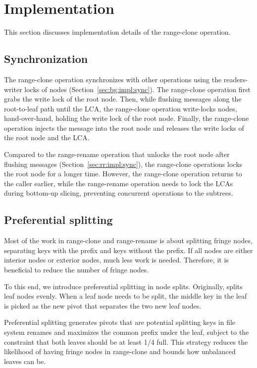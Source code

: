 \section{Implementation}
\label{sec:rc:impl}

This section discusses implementation details of the range-clone operation.

\subsection{Synchronization}

The range-clone operation synchronizes with other \bet operations using the
readers-writer locks of \bet nodes
(Section~\ref{sec:bg:impl:sync}).
The range-clone operation first grabs the write lock of the root node.
Then, while flushing messages along the root-to-leaf path until the LCA,
the range-clone operation write-locks \bet nodes, hand-over-hand,
holding the write lock of the root node.
Finally, the range-clone operation injects the \goto message into the root node
and releases the write locks of the root node and the LCA.

Compared to the range-rename operation that unlocks the root node after flushing
messages (Section~\ref{sec:rr:impl:sync}),
the range-clone operations locks the root node for a longer time.
However, the range-clone operation returns to the caller earlier,
while the range-rename operation needs to lock the LCAs during bottom-up
slicing, preventing concurrent operations to the subtrees.

\subsection{Preferential splitting}
\label{sec:rc:impl:pfsplit}

Most of the work in range-clone and range-rename is about splitting fringe
nodes, separating keys with the prefix and keys without the prefix.
If all nodes are either interior nodes or exterior nodes, much less work is
needed.
Therefore, it is beneficial to reduce the number of fringe nodes.

To this end, we introduce preferential splitting in node splits.
Originally, \fti splits leaf nodes evenly.
When a leaf node needs to be split, the middle key in the leaf is picked as the
new pivot that separates the two new leaf nodes.

Preferential splitting generates pivots that are potential splitting keys in
file system renames and maximizes the common prefix under the leaf,
subject to the constraint that both leaves should be at least 1/4 full.
This strategy reduces the likelihood of having fringe nodes
in range-clone and bounds how unbalanced leaves can be.

